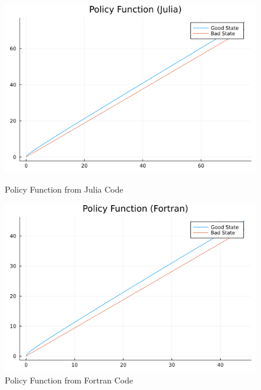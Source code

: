 \documentclass[12pt]{article}
\begin{document}
\begin{figure} [!htbp]
    \centering
    \begin{minipage}{0.45\textwidth}
        \centering
        \includegraphics[width=\textwidth]{02_Policy_Functions.png}
        \caption{Policy Function from Julia Code}
    \end{minipage}\hfill
    \begin{minipage}{0.45\textwidth}
        \centering
        \includegraphics[width=\textwidth]{02_Policy_Functions_Fortran.png} 
        \caption{Policy Function from Fortran Code}
    \end{minipage}
\end{figure}
\end{document}
